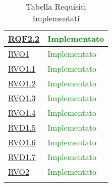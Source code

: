 \begin{longtable}{|>{\centering}m{5cm}|m{5cm}<{\centering}|}
\hyperlink{RQF2.2}{RQF2.2} & \textcolor{green}{Implementato}\\ \hline

\hyperlink{RVO1}{RVO1} &  \textcolor{green}{Implementato}\\ \hline

\hyperlink{RVO1.1}{RVO1.1} & \textcolor{green}{Implementato}\\ \hline

\hyperlink{RVO1.2}{RVO1.2} & \textcolor{green}{Implementato}\\ \hline

\hyperlink{RVO1.3}{RVO1.3} & \textcolor{green}{Implementato}\\ \hline

\hyperlink{RVO1.4}{RVO1.4} & \textcolor{green}{Implementato}\\ \hline

\hyperlink{RVD1.5}{RVD1.5} &  \textcolor{green}{Implementato}\\ \hline

\hyperlink{RVO1.6}{RVO1.6} &  \textcolor{green}{Implementato}\\ \hline

\hyperlink{RVD1.7}{RVD1.7} & \textcolor{green}{Implementato}\\ \hline

\hyperlink{RVO2}{RVO2} &  \textcolor{green}{Implementato}\\ \hline

\caption[Tabella Requisiti Implementati]{Tabella Requisiti Implementati}
\label{tabella:requisiti implementati}
\end{longtable}
\clearpage

